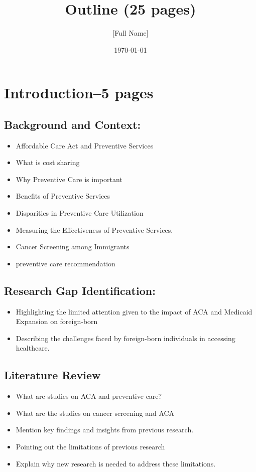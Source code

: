 \documentclass[10pt, oneside]{article}
\title{Outline (25 pages)}
\author{[Full Name]}
\date{\today}
\begin{document}
\maketitle

\vspace{.25in}

\section{Introduction--5 pages}
\subsection {Background and Context:}
\begin{itemize}
\item Affordable Care Act and Preventive Services
\item What is cost sharing
\item Why Preventive Care is important
\item Benefits of Preventive Services
\item Disparities in Preventive Care Utilization
\item Measuring the Effectiveness of Preventive Services.
\item Cancer Screening among Immigrants
\item preventive care recommendation


\end{itemize}


\subsection{Research Gap Identification:}
\begin{itemize}
\item Highlighting the limited attention given to the impact of ACA and Medicaid Expansion on foreign-born 
\item Describing the challenges faced by foreign-born individuals in accessing healthcare.
\end{itemize}



\subsection{Literature Review}


\begin{itemize}
\item What are studies on ACA and preventive care? 
\item What are the studies on cancer screening and ACA
\item Mention key findings and insights from previous research.
\item Pointing out the limitations of previous research
\item Explain why new research is needed to address these limitations.
\end{itemize}
\end{document}
